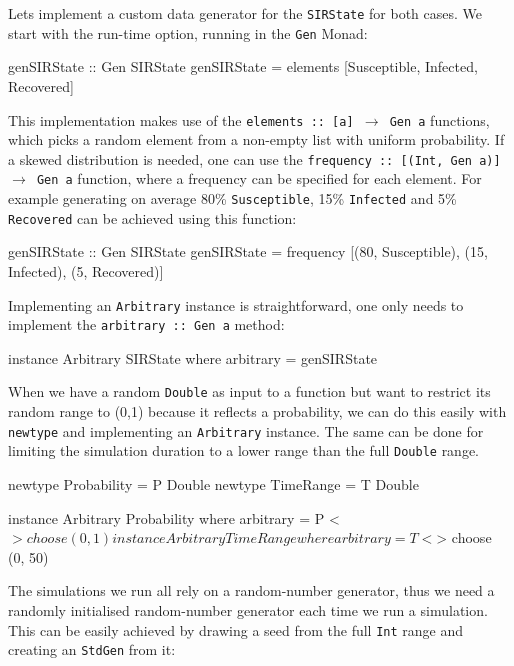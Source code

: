 Lets implement a custom data generator for the \texttt{SIRState} for both cases. We start with the run-time option, running in the \texttt{Gen} Monad:

\begin{HaskellCode}
genSIRState :: Gen SIRState
genSIRState = elements [Susceptible, Infected, Recovered]
\end{HaskellCode}

This implementation makes use of the \texttt{elements :: [a] $\rightarrow$ Gen a} functions, which picks a random element from a non-empty list with uniform probability. If a skewed distribution is needed, one can use the \texttt{frequency :: [(Int, Gen a)] $\rightarrow$ Gen a} function, where a frequency can be specified for each element. For example generating on average 80\% \texttt{Susceptible}, 15\% \texttt{Infected} and 5\% \texttt{Recovered} can be achieved using this function:

\begin{HaskellCode}
genSIRState :: Gen SIRState
genSIRState = frequency [(80, Susceptible), (15, Infected), (5, Recovered)]
\end{HaskellCode}

Implementing an \texttt{Arbitrary} instance is straightforward, one only needs to implement the \texttt{arbitrary :: Gen a} method:

\begin{HaskellCode}
instance Arbitrary SIRState where
  arbitrary = genSIRState
\end{HaskellCode}

When we have a random \texttt{Double} as input to a function but want to restrict its random range to (0,1) because it reflects a probability, we can do this easily with \texttt{newtype} and implementing an \texttt{Arbitrary} instance. The same can be done for limiting the simulation duration to a lower range than the full \texttt{Double} range.

\begin{HaskellCode}
newtype Probability = P Double
newtype TimeRange   = T Double

instance Arbitrary Probability where
  arbitrary = P <$> choose (0, 1)
  
instance Arbitrary TimeRange where
  arbitrary = T <$> choose (0, 50)
\end{HaskellCode}

The simulations we run all rely on a random-number generator, thus we need a randomly initialised random-number generator each time we run a simulation. This can be easily achieved by drawing a seed from the full \texttt{Int} range and creating an \texttt{StdGen} from it:

